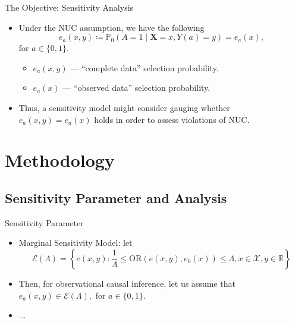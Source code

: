 \documentclass{beamer}
\newcommand{\R}{\mathbb{R}}
\newcommand{\pr}{\mathbb{P}}
\begin{document}
\begin{frame}{The Objective: Sensitivity Analysis}

\begin{itemize}
  \itemsep12pt
  \item Under the NUC assumption, we have the following
    \[
      e_a(x,y) \coloneqq \pr_0(A = 1 \mid \bm{X} = x, Y(a) = y) = e_a(x),
    \]
    for $a \in \{0, 1\}$.
    \begin{itemize}
      \item $e_a(x,y)$ --- ``complete data'' selection probability.
      \item $e_a(x)$ --- ``observed data'' selection probability.
    \end{itemize}
  \item Thus, a sensitivity model might consider gauging whether $e_a(x,y) =
    e_a(x)$ holds in order to assess violations of NUC.
\end{itemize}

\end{frame}

\section{Methodology}
\subsection{Sensitivity Parameter and Analysis}

\begin{frame}{Sensitivity Parameter}

\begin{itemize}
  \itemsep12pt
  \item Marginal Sensitivity Model: let
    \[
      \mathcal{E}(\Lambda) = \left\{e(x,y): \frac{1}{\Lambda} \leq
      \text{OR}(e(x,y), e_0(x)) \leq \Lambda, x \in \mathcal{X}, y \in
      \R \right\}
    \]
  \item Then, for observational causal inference, let us assume that
    $e_a(x,y) \in \mathcal{E}(\Lambda),$ for $a \in \{0, 1\}$.
  \item ...
\end{itemize}

\end{frame}

\end{document}
